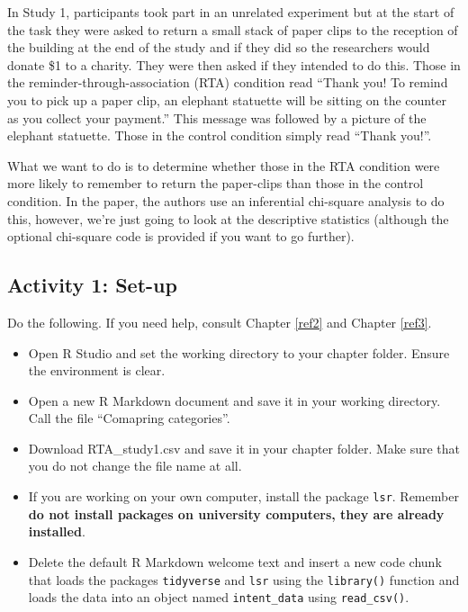 \documentclass[]{book}
\providecommand{\tightlist}{%
  \setlength{\itemsep}{0pt}\setlength{\parskip}{0pt}}
\begin{document}
In Study 1, participants took part in an unrelated experiment but at the start of the task they were asked to return a small stack of paper clips to the reception of the building at the end of the study and if they did so the researchers would donate \$1 to a charity. They were then asked if they intended to do this. Those in the reminder-through-association (RTA) condition read ``Thank you! To remind you to pick up a paper clip, an elephant statuette will be sitting on the counter as you collect your payment.'' This message was followed by a picture of the elephant statuette. Those in the control condition simply read ``Thank you!''.

What we want to do is to determine whether those in the RTA condition were more likely to remember to return the paper-clips than those in the control condition. In the paper, the authors use an inferential chi-square analysis to do this, however, we're just going to look at the descriptive statistics (although the optional chi-square code is provided if you want to go further).

\hypertarget{activity-1-set-up-4}{%
\subsection{Activity 1: Set-up}\label{activity-1-set-up-4}}

Do the following. If you need help, consult Chapter \ref{ref2} and Chapter \ref{ref3}.

\begin{itemize}
\tightlist
\item
  Open R Studio and set the working directory to your chapter folder. Ensure the environment is clear.\\
\item
  Open a new R Markdown document and save it in your working directory. Call the file ``Comapring categories''.\\
\item
  Download RTA\_study1.csv and save it in your chapter folder. Make sure that you do not change the file name at all.
\item
  If you are working on your own computer, install the package \texttt{lsr}. Remember \textbf{do not install packages on university computers, they are already installed}.
\item
  Delete the default R Markdown welcome text and insert a new code chunk that loads the packages \texttt{tidyverse} and \texttt{lsr} using the \texttt{library()} function and loads the data into an object named \texttt{intent\_data} using \texttt{read\_csv()}.
\end{itemize}
\end{document}
